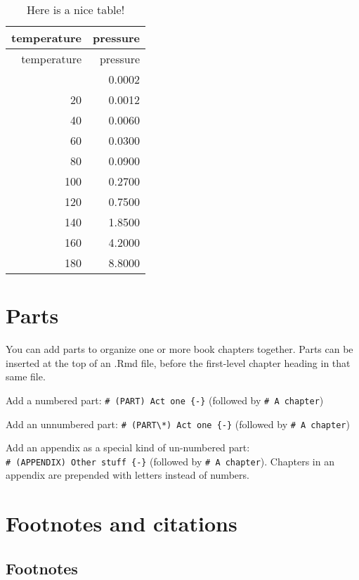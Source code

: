 \documentclass[
]{book}
\begin{document}
\begin{longtable}[]{@{}rr@{}}
\caption{Here is a nice table!}\tabularnewline
\toprule\noalign{}
temperature & pressure \\
\midrule\noalign{}
\endfirsthead
\toprule\noalign{}
temperature & pressure \\
\midrule\noalign{}
\endhead
\bottomrule\noalign{}
\endlastfoot
0 & 0.0002 \\
20 & 0.0012 \\
40 & 0.0060 \\
60 & 0.0300 \\
80 & 0.0900 \\
100 & 0.2700 \\
120 & 0.7500 \\
140 & 1.8500 \\
160 & 4.2000 \\
180 & 8.8000 \\
\end{longtable}

\hypertarget{parts}{%
\chapter{Parts}\label{parts}}

You can add parts to organize one or more book chapters together. Parts
can be inserted at the top of an .Rmd file, before the first-level
chapter heading in that same file.

Add a numbered part: \texttt{\#\ (PART)\ Act\ one\ \{-\}} (followed by
\texttt{\#\ A\ chapter})

Add an unnumbered part:
\texttt{\#\ (PART\textbackslash{}*)\ Act\ one\ \{-\}} (followed by
\texttt{\#\ A\ chapter})

Add an appendix as a special kind of un-numbered part:
\texttt{\#\ (APPENDIX)\ Other\ stuff\ \{-\}} (followed by
\texttt{\#\ A\ chapter}). Chapters in an appendix are prepended with
letters instead of numbers.

\hypertarget{footnotes-and-citations}{%
\chapter{Footnotes and citations}\label{footnotes-and-citations}}

\hypertarget{footnotes}{%
\section{Footnotes}\label{footnotes}}
\end{document}
